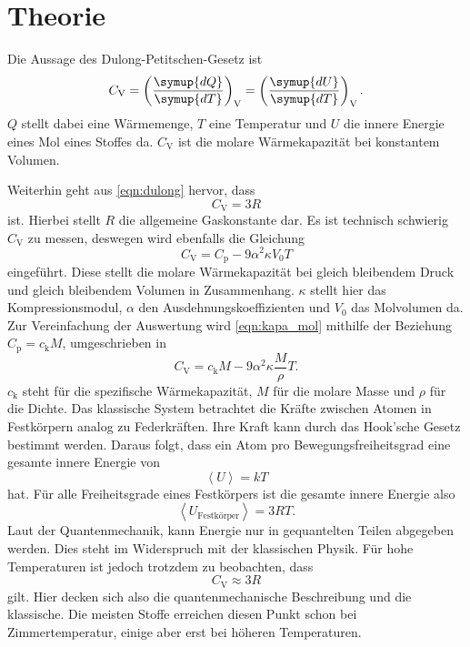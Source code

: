 \section{Theorie}
\label{sec:Theorie}

Die Aussage des Dulong-Petitschen-Gesetz ist
\begin{equation}
    C_\text{V} = \left ( \frac{\symup{dQ}}{\symup{dT}} \right )_\text{V} = \left ( \frac{\symup{dU}}{\symup{dT}} \right )_\text{V}  .
    \label{eqn:dulong}
\end{equation}
$Q$ stellt dabei eine Wärmemenge, $T$ eine Temperatur und $U$ die innere Energie eines Mol eines Stoffes da.
$C_\text{V}$ ist die molare Wärmekapazität bei konstantem Volumen.

Weiterhin geht aus \eqref{eqn:dulong} hervor, dass
\begin{equation}
    C_\text{V} = 3R
    \label{eqn:dulong_klassisch}
\end{equation}
ist. Hierbei stellt $R$ die allgemeine Gaskonstante dar.
Es ist technisch schwierig $C_\text{V}$ zu messen, deswegen wird ebenfalls die Gleichung
\begin{equation}
    C_\text{V} = C_\text{p} - 9 \alpha^2 \kappa V_0 T
    \label{eqn:kapa_mol}
\end{equation}
eingeführt.
Diese stellt die molare Wärmekapazität bei gleich bleibendem Druck und gleich bleibendem Volumen in Zusammenhang.
$\kappa$ stellt hier das Kompressionsmodul, $\alpha$ den Ausdehnungskoeffizienten und $V_0$ das Molvolumen da.
Zur Vereinfachung der Auswertung wird \eqref{eqn:kapa_mol} mithilfe der Beziehung $C_\text{p} = c_\text{k} M$, umgeschrieben in
\begin{equation}
    C_\text{V} = c_\text{k} M - 9\alpha^2 \kappa \frac{M}{\rho}T .
    \label{eqn:waerme_vol}
\end{equation}
$c_\text{k}$ steht für die spezifische Wärmekapazität, $M$ für die molare Masse und $\rho$ für die Dichte.
Das klassische System betrachtet die Kräfte zwischen Atomen in Festkörpern analog zu Federkräften.
Ihre Kraft kann durch das Hook'sche Gesetz bestimmt werden.
Daraus folgt, dass ein Atom pro Bewegungsfreiheitsgrad eine gesamte innere Energie von
\begin{equation*}
    \left < U \right > = kT
\end{equation*}
hat.
Für alle Freiheitsgrade eines Festkörpers ist die gesamte innere Energie also
\begin{equation*}
    \left < U_\text{Festkörper} \right > = 3RT.
\end{equation*}
Laut der Quantenmechanik, kann Energie nur in gequantelten Teilen abgegeben werden.
Dies steht im Widerspruch mit der klassischen Physik.
Für hohe Temperaturen ist jedoch trotzdem zu beobachten, dass 
\begin{equation*}
    C_\text{V} \approx 3 R
\end{equation*}
gilt.
Hier decken sich also die quantenmechanische Beschreibung und die klassische.
Die meisten Stoffe erreichen diesen Punkt schon bei Zimmertemperatur, einige aber erst bei höheren Temperaturen.

